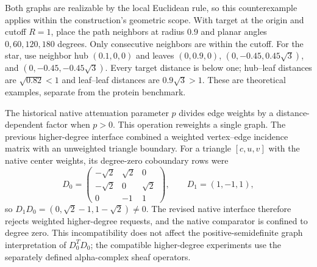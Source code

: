 Both graphs are realizable by the local Euclidean rule, so this counterexample applies within the construction's geometric scope. With target at the origin and cutoff $R=1$, place the path neighbors at radius $0.9$ and planar angles $0,60,120,180$ degrees. Only consecutive neighbors are within the cutoff. For the star, use neighbor hub $(0.1,0,0)$ and leaves $(0,0.9,0)$, $(0,-0.45,0.45\sqrt3)$, and $(0,-0.45,-0.45\sqrt3)$. Every target distance is below one; hub--leaf distances are $\sqrt{0.82}<1$ and leaf--leaf distances are $0.9\sqrt3>1$. These are theoretical examples, separate from the protein benchmark.

The historical native attenuation parameter $p$ divides edge weights by a distance-dependent factor when $p>0$. This operation reweights a single graph. The previous higher-degree interface combined a weighted vertex--edge incidence matrix with an unweighted triangle boundary. For a triangle $[c,u,v]$ with the native center weights, its degree-zero coboundary rows were
\begin{equation}
D_0=\begin{pmatrix}-\sqrt2&\sqrt2&0\\-\sqrt2&0&\sqrt2\\0&-1&1\end{pmatrix},
\qquad D_1=(1,-1,1),
\end{equation}
so $D_1D_0=(0,\sqrt2-1,1-\sqrt2)\ne0$. The revised native interface therefore rejects weighted higher-degree requests, and the native comparator is confined to degree zero. This incompatibility does not affect the positive-semidefinite graph interpretation of $D_0^TD_0$; the compatible higher-degree experiments use the separately defined alpha-complex sheaf operators.
